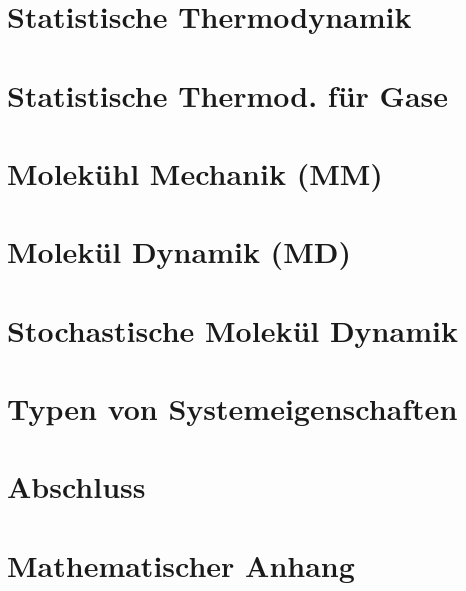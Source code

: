 \documentclass[
    fourColumns,
    landscape,
]{formularyETH/formularyETH}
\begin{document}
\section{Statistische Thermodynamik}
\label{sec:STT}

	\vfill\columnbreak




	\vfill\columnbreak


	\vfill\columnbreak

\newpage
\section{Statistische Thermod. für Gase}
\label{sec:statgase}

\newpage
\section{Molekühl Mechanik (MM)}
\label{sec:MM}

\newpage
\section{Molekül Dynamik (MD)}
\label{sec:MD}

\newpage
\section{Stochastische Molekül Dynamik}

\section{Typen von Systemeigenschaften}

\section{Abschluss}

\newpage
\section{Mathematischer Anhang}


% 
  
\end{document}
